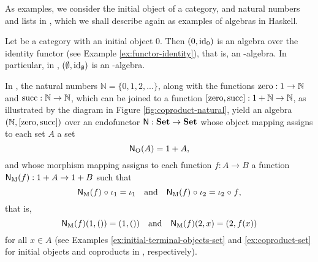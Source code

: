 As examples, we consider the initial object of a category, and natural
numbers and lists in \set, which we shall describe again as examples
of algebras in Haskell.

\begin{example}
  \label{ex:algebra-initial-object}


  Let  be a category with an initial object $0$. Then
  $(0,\operatorname{id}_{0})$ is an algebra over the identity functor (see Example
  \ref{ex:functor-identity}), that is, an -al\-ge\-bra. In
  particular, in \set, $(\emptyset,\operatorname{id}_{\emptyset})$ is an
  -algebra.

\end{example}

\begin{example}
  \label{ex:algebra-natural}


  In \set, the natural numbers $\mathbb{N} = \{0,1,2,...\}$, along
  with the functions $\operatorname{zero}: 1 \to \mathbb{N}$ and $\operatorname{succ}: \mathbb{N}
  \to \mathbb{N}$, which can be joined to a function $[\operatorname{zero},\operatorname{succ}]: 1
  + \mathbb{N} \to \mathbb{N}$, as illustrated by the diagram in
  Figure \ref{fig:coproduct-natural}, yield an algebra
  $(\mathbb{N},[\operatorname{zero},\operatorname{succ}])$ over an endofunctor $\mathsf{N}: \mathbf{Set} \to
  \mathbf{Set}$ whose object mapping assigns to each set $A$ a set
  \begin{equation*}
    \mathsf{N}_{\operatorname{O}}(A) = 1 + A
    \text{,}
  \end{equation*}
  and whose morphism mapping assigns to each function $f: A \to B$ a
  function $\mathsf{N}_{\operatorname{M}}(f): 1 + A \to 1 + B$ such that
  \begin{equation*}
    \mathsf{N}_{\operatorname{M}}(f) \mathrel{\circ} \iota_{1} = \iota_{1}
    \quad
    \text{and}
    \quad
    \mathsf{N}_{\operatorname{M}}(f) \mathrel{\circ} \iota_{2} = \iota_{2} \mathrel{\circ} f
    \text{,}
  \end{equation*}
  that is,
  \begin{equation*}
    \mathsf{N}_{\operatorname{M}}(f)(1,()) = (1,())
    \quad
    \text{and}
    \quad
    \mathsf{N}_{\operatorname{M}}(f)(2,x) = (2,f(x))
  \end{equation*}
  for all $x \in A$ (see Examples
  \ref{ex:initial-terminal-objects-set} and \ref{ex:coproduct-set} for
  initial objects and coproducts in \set, respectively).

  \begin{figure}[htb]
    \begin{center}
\end{center}
\end{figure}
\end{example}
